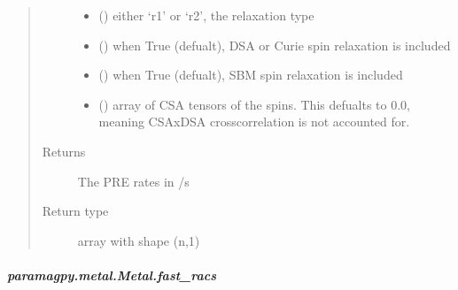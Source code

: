 \documentclass[a4paper,10pt,english]{sphinxmanual}
\begin{document}
\begin{fulllineitems}
\begin{fulllineitems}
\begin{fulllineitems}
\begin{quote}
\begin{description}
\begin{itemize}
\item {} 
 () \textendash{} either ‘r1’ or ‘r2’, the relaxation type

\item {} 
 (\sphinxstyleliteralemphasis{\sphinxupquote{ (}}\sphinxstyleliteralemphasis{\sphinxupquote{)}}) \textendash{} when True (defualt), DSA or Curie spin relaxation is included

\item {} 
 (\sphinxstyleliteralemphasis{\sphinxupquote{ (}}\sphinxstyleliteralemphasis{\sphinxupquote{)}}) \textendash{} when True (defualt), SBM spin relaxation is included

\item {} 
 (\sphinxstyleliteralemphasis{\sphinxupquote{ (}}\sphinxstyleliteralemphasis{\sphinxupquote{,}}\sphinxstyleliteralemphasis{\sphinxupquote{,}}\sphinxstyleliteralemphasis{\sphinxupquote{) }}\sphinxstyleliteralemphasis{\sphinxupquote{(}}\sphinxstyleliteralemphasis{\sphinxupquote{)}}) \textendash{} array of CSA tensors of the spins.
This defualts to 0.0, meaning CSAxDSA crosscorrelation is
not accounted for.

\end{itemize}

\item[{Returns}] \leavevmode
{} \textendash{} The PRE rates in /s

\item[{Return type}] \leavevmode
array with shape (n,1)

\end{description}\end{quote}

\end{fulllineitems}



\subparagraph{paramagpy.metal.Metal.fast\_racs}
\label{\detokenize{reference/generated/paramagpy.metal.Metal.fast_racs:paramagpy-metal-metal-fast-racs}}\label{\detokenize{reference/generated/paramagpy.metal.Metal.fast_racs::doc}}


\end{fulllineitems}
\end{fulllineitems}
\end{document}
